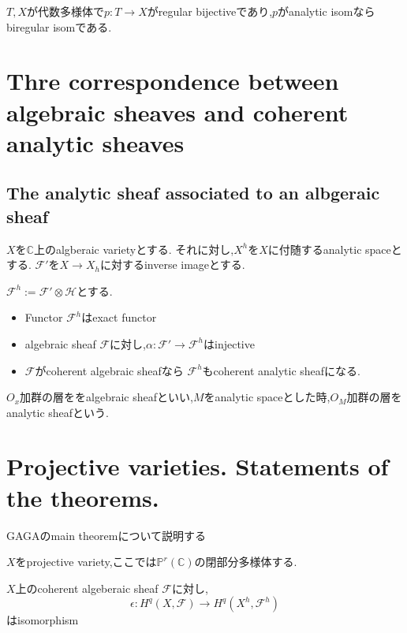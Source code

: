 \begin{prop}
 $T,X$が代数多様体で$p: T \to X$がregular bijectiveであり,$p$がanalytic isomならbiregular isomである.
\end{prop}

\section{Thre correspondence between algebraic sheaves and coherent analytic sheaves}

\subsection{The analytic sheaf associated to an albgeraic sheaf}
$X$を$\mathbb{C}$上のalgberaic varietyとする.
それに対し,$X^h$を$X$に付随するanalytic spaceとする.
$\mathcal{F}'$を$X \to X_h$に対するinverse imageとする.

$\mathcal{F}^h:= \mathcal{F}' \otimes \mathcal{H}$とする.

\begin{prop}
 \begin{itemize}
     \item Functor $\mathcal{F}^h$はexact functor
     \item algebraic sheaf $\mathcal{F}$に対し,$\alpha: \mathcal{F}' \to \mathcal{F}^h$はinjective
     \item $\mathcal{F}$がcoherent algebraic sheafなら $\mathcal{F}^h$もcoherent analytic sheafになる.
 \end{itemize}
\end{prop}



$O_x$加群の層ををalgebraic sheafといい,$M$をanalytic spaceとした時,$O_{M}$加群の層をanalytic sheafという.


\section{Projective varieties. Statements of the theorems.}
GAGAのmain theoremについて説明する

$X$をprojective variety,ここでは$\mathbb{P}^r(\mathbb{C})$の閉部分多様体する.

\begin{thm}\label{cohomology theorem}
$X$上のcoherent algeberaic sheaf $\mathcal{F}$に対し,
\begin{equation*}
 \epsilon: H^q(X, \mathcal{F}) \to H^q(X^h, \mathcal{F}^h)
\end{equation*}
はisomorphism
\end{thm}

